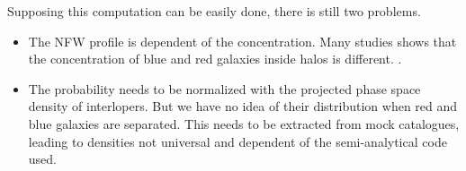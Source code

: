Supposing this computation can be easily done, there is still two problems.
\begin{itemize}
    \item The NFW profile is dependent of the concentration. Many studies
        shows that the concentration of blue and red galaxies inside halos
        is different. .
    \item The probability needs to be normalized with the projected phase
        space density of interlopers. But we have no idea of their
        distribution when red and blue galaxies are separated. This needs to
        be extracted from mock catalogues, leading to densities not
        universal and dependent of the semi-analytical code used.
\end{itemize}
